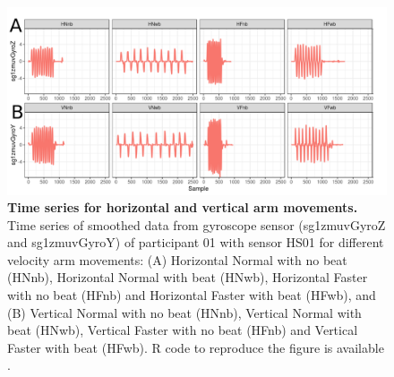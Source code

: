 \begin{figure}[!h] 
  \centering
  \includegraphics[width=1.0\textwidth]{hii-sts}
    \caption{
	{\bf Time series for horizontal and vertical arm movements.} 
		Time series of smoothed data from gyroscope sensor 
		(sg1zmuvGyroZ and sg1zmuvGyroY) of participant 01 
		with sensor HS01 for different velocity arm movements: 
		(A) Horizontal Normal with no beat (HNnb),
			Horizontal Normal with beat (HNwb), 
			Horizontal Faster with no beat (HFnb) and
			Horizontal Faster with beat (HFwb), and 
		(B) Vertical Normal with no beat (HNnb),
			Vertical Normal with beat (HNwb), 
			Vertical Faster with no beat (HFnb) and
			Vertical Faster with beat (HFwb).
		R code to reproduce the figure is available \cite{hwum2018}.
        }
	\label{fig:hii-sts}
\end{figure}






